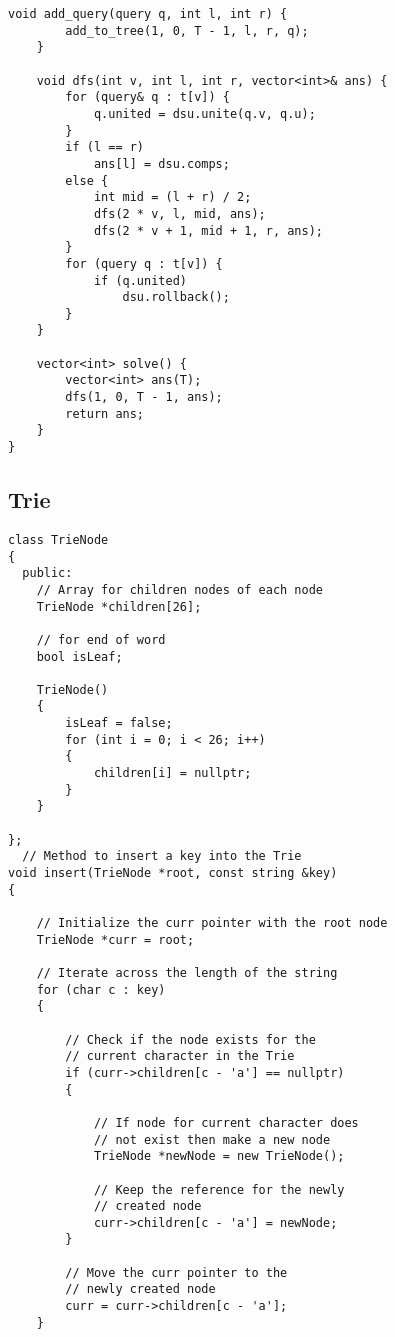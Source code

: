 \documentclass[10pt]{article}
\begin{document}
\begin{multicols*}{2}
\begin{lstlisting}[style=compactcpp]
    void add_query(query q, int l, int r) {
        add_to_tree(1, 0, T - 1, l, r, q);
    }

    void dfs(int v, int l, int r, vector<int>& ans) {
        for (query& q : t[v]) {
            q.united = dsu.unite(q.v, q.u);
        }
        if (l == r)
            ans[l] = dsu.comps;
        else {
            int mid = (l + r) / 2;
            dfs(2 * v, l, mid, ans);
            dfs(2 * v + 1, mid + 1, r, ans);
        }
        for (query q : t[v]) {
            if (q.united)
                dsu.rollback();
        }
    }

    vector<int> solve() {
        vector<int> ans(T);
        dfs(1, 0, T - 1, ans);
        return ans;
    }
}
\end{lstlisting}

\subsection{Trie}

\begin{lstlisting}[style=compactcpp]
class TrieNode
{
  public:
    // Array for children nodes of each node
    TrieNode *children[26];

    // for end of word
    bool isLeaf;

    TrieNode()
    {
        isLeaf = false;
        for (int i = 0; i < 26; i++)
        {
            children[i] = nullptr;
        }
    }

};
  // Method to insert a key into the Trie
void insert(TrieNode *root, const string &key)
{

    // Initialize the curr pointer with the root node
    TrieNode *curr = root;

    // Iterate across the length of the string
    for (char c : key)
    {

        // Check if the node exists for the
        // current character in the Trie
        if (curr->children[c - 'a'] == nullptr)
        {

            // If node for current character does
            // not exist then make a new node
            TrieNode *newNode = new TrieNode();

            // Keep the reference for the newly
            // created node
            curr->children[c - 'a'] = newNode;
        }

        // Move the curr pointer to the
        // newly created node
        curr = curr->children[c - 'a'];
    }


\end{lstlisting}
\end{multicols*}
\end{document}
